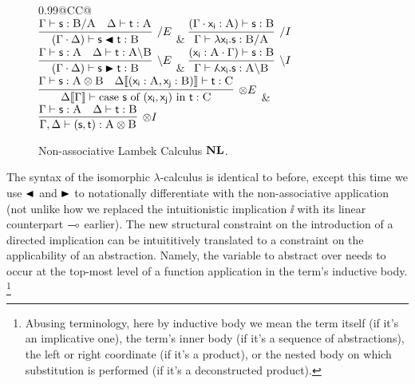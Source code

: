 \begin{figure}
	\centering
	\begin{tabularx}{0.99\textwidth}{@{}CC@{}}
		\\[2em]
		$\infer[\divright E]{(\Gamma \sbind \Delta) \vdash \term{s}\nappright\term{t}: \prop B}{\Gamma \vdash \term{s}: \prop{B} \divright \prop{A} & \Delta \vdash \term{t}: \prop{A}}$
		& 
		$\infer[\divright I]{\Gamma \vdash \term{\lambda x_i.s}: \prop{B} \divright \prop{A}}{(\Gamma \sbind \term{x_i}: \prop A) \vdash \term{s}:\prop B}$\\[2em]
		$\infer[\divleft E]{(\Gamma \sbind \Delta) \vdash \term{s}\nappleft\term{t}:\prop B}{\Gamma \vdash \term{s}: \prop A & \Delta \vdash \term{t}: \prop{A}\divleft\prop{B}}$
		& 
		$\infer[\divleft I]{\Gamma \vdash \term{\adbmal x_i.s}: \prop A \divleft \prop B}{(\term{x_i}: \prop A \sbind \Gamma) \vdash  \term{s}:\prop B}$\\[2em]
		$\infer[\otimes E]{\Delta\ctx{\Gamma} \vdash \cterm{case \term{s} of \term{(x_i, x_j)} in \term{t}}: \prop C}{
			\Gamma \vdash \term{s}: \prop{A}\otimes\prop{B}
			&
			\Delta\ctx{(\term{x_i}: \prop A, \term{x_j}: \prop{B})}  \vdash \term{t}: \prop C}$
		&
		$\infer[\otimes I]{\Gamma,\Delta \vdash \term{(s,t)}: \prop A \otimes \prop B}{\Gamma \vdash \term{s}: \prop A & \Delta \vdash \term{t}: \prop B}$
	\end{tabularx}
	\caption{Non-associative Lambek Calculus $\textbf{NL}$.}
	\label{figure:non_assoc_lambek_rules}
\end{figure}

The syntax of the isomorphic $\lambda$-calculus is identical to before, except this time we use $\blacktriangleleft$ and $\blacktriangleright$ to notationally differentiate with the non-associative application (not unlike how we replaced the intuitionistic implication $\ii$ with its linear counterpart $\li$ earlier).
The new structural constraint on the introduction of a directed implication can be intuititively translated to a constraint on the applicability of an abstraction.
Namely, the variable to abstract over needs to occur at the top-most level of a function application in the term's inductive body.%
\footnote{Abusing terminology, here by inductive body we mean the term itself (if it's an implicative one), the term's inner body (if it's a sequence of abstractions), the left or right coordinate (if it's a product), or the nested body on which substitution is performed (if it's a deconstructed product).}

